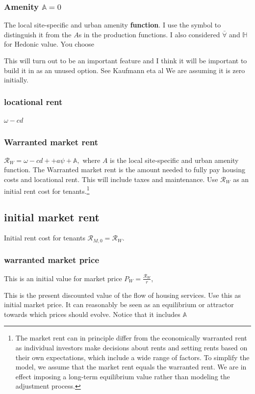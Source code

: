 \subsubsection{Amenity $\mathbb{A}=0$} 
The local site-specific and urban amenity \textbf{function}.  I use the symbol to distinguish it from the $A$s in the production functions. I also  considered  $\bar\forall$ and $\mathbb{H}$ for Hedonic value. You choose

This will turn out to be an important feature and I think it will be important to build it in as an unused option. See Kaufmann eta  al \cite{kaufmannScalingUrbanAmenities2022} We are assuming it is zero initially.
\subsubsection{locational rent}  $\omega-cd$ 

\subsubsection{Warranted market rent} $\mathcal{R}_W = \omega - cd+ + a\psi + \mathbb{A},$
where $A$ is the local site-specific and urban amenity function. The Warranted \gls{market rent} is the amount needed to fully pay housing costs and locational rent. This will include taxes and maintenance. Use  $\mathcal{R}_W$ as an initial rent cost for tenants.\footnote{The market rent can in principle differ from the economically warranted rent as individual investors make decisions about rents and setting rents based on their own expectations, which include a wide range of factors. To simplify the model, we assume that the market rent equals the warranted rent. We are in effect imposing a long-term equilibrium value rather than modeling the adjustment process.} 


\subsection{initial market rent} 
Initial rent cost for tenants  $\mathcal{R}_{M, 0}= \mathcal{R}_W$.


\subsubsection{warranted market price}  
This is  an initial value for market price 
 $P_W=\frac{\mathcal{R}_W }{r}$,  

This is the present discounted value of the flow of housing services.  Use this as initial market price.  It can reasonably be seen as an equilibrium or attractor towards which prices should  evolve.  Notice that it includes $\mathbb{A}$




